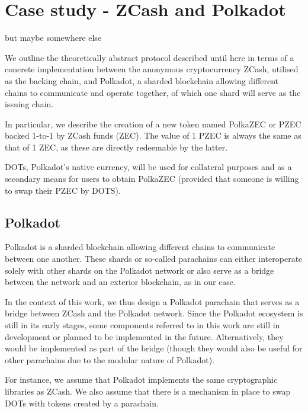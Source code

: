 
\chapter{Case study - ZCash and Polkadot}

\cite{stewart2020grandpa} but maybe somewhere else

We outline the theoretically abstract protocol described until here in terms of a concrete implementation between the anonymous cryptocurrency ZCash, utilised as the backing chain, and Polkadot, a sharded blockchain allowing different chains to communicate and operate together, of which one shard will serve as the issuing chain.

In particular, we describe the creation of a new token named PolkaZEC or PZEC backed 1-to-1 by ZCash funds (ZEC).
The value of 1 PZEC is always the same as that of 1 ZEC, as these are directly redeemable by the latter.

DOTs, Polkadot's native currency, will be used for collateral purposes and as a secondary means for users to obtain PolkaZEC (provided that someone is willing to swap their PZEC by DOTS).

\section{Polkadot}
\label{sec:polkadot}

Polkadot is a sharded blockchain allowing different chains to communicate between one another.
These shards or so-called parachains can either interoperate solely with other shards on the Polkadot network or also serve as a bridge between the network and an exterior blockchain, as in our case.

In the context of this work, we thus design a Polkadot parachain that serves as a bridge between ZCash and the Polkadot network.
Since the Polkadot ecosystem is still in its early stages, some components referred to in this work are still in development or planned to be implemented in the future.
Alternatively, they would be implemented as part of the bridge (though they would also be useful for other parachains due to the modular nature of Polkadot).



For instance, we assume that Polkadot implements the same cryptographic libraries as ZCash.
We also assume that there is a mechanism in place to swap DOTs with tokens created by a parachain.


